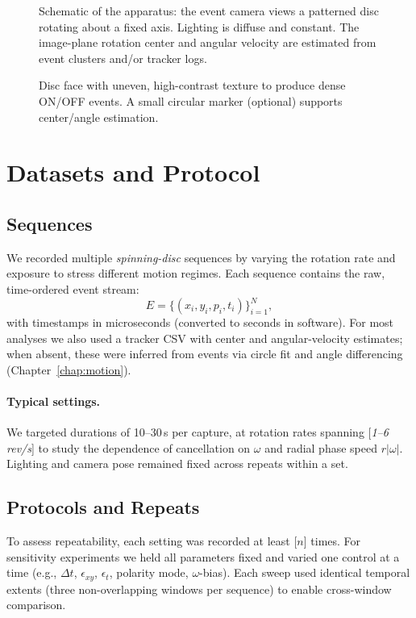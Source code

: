 \begin{figure}[t]
  \centering
  \caption{Schematic of the apparatus: the event camera views a patterned disc rotating about a fixed axis. Lighting is diffuse and constant. The image-plane rotation center and angular velocity are estimated from event clusters and/or tracker logs.}
  \label{fig:rig}
\end{figure}

\begin{figure}[t]
  \centering
  \caption{Disc face with uneven, high-contrast texture to produce dense ON/OFF events. A small circular marker (optional) supports center/angle estimation.}
  \label{fig:disc}
\end{figure}

\section{Datasets and Protocol}
\label{sec:datasets}

\subsection{Sequences}
We recorded multiple \emph{spinning-disc} sequences by varying the rotation rate and exposure to stress different motion regimes. Each sequence contains the raw, time-ordered event stream:
\[
E = \big\{ (x_i, y_i, p_i, t_i) \big\}_{i=1}^{N},
\]
with timestamps in microseconds (converted to seconds in software). For most analyses we also used a tracker CSV with center and angular-velocity estimates; when absent, these were inferred from events via circle fit and angle differencing (Chapter~\ref{chap:motion}).

\paragraph{Typical settings.}
We targeted durations of 10--30\,s per capture, at rotation rates spanning [\textit{1--6 rev/s}] to study the dependence of cancellation on $\omega$ and radial phase speed $r|\omega|$. Lighting and camera pose remained fixed across repeats within a set.

\subsection{Protocols and Repeats}
To assess repeatability, each setting was recorded at least [\textit{$n$}] times. For sensitivity experiments we held all parameters fixed and varied one control at a time (e.g., $\Delta t$, $\epsilon_{xy}$, $\epsilon_t$, polarity mode, $\omega$-bias). Each sweep used identical temporal extents (three non-overlapping windows per sequence) to enable cross-window comparison.

